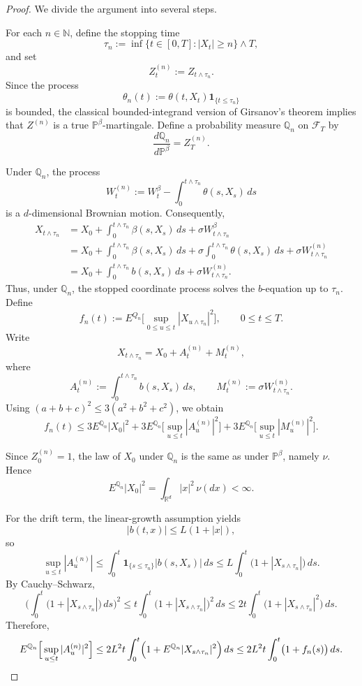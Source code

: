 \documentclass[twoside,11pt]{article}
\numberwithin{equation}{section}
\begin{document}
\begin{proof}
We divide the argument into several steps.

\medskip
For each $n\in\mathbb N$, define the stopping time
\[
\tau_n:=\inf\{t\in[0,T]: |X_t|\ge n\}\wedge T,
\]
and set
\[
Z_t^{(n)}:=Z_{t\wedge \tau_n}.
\]
Since the process
\[
\theta_n(t):=\theta(t,X_t)\mathbf 1_{\{t\le \tau_n\}}
\]
is bounded, the classical bounded-integrand version of Girsanov's theorem implies that $Z^{(n)}$ is a true $\mathbb{P}^\beta$-martingale. Define a probability measure $\mathbb{Q}_n$ on $\mathcal F_T$ by
\[
\frac{d\mathbb{Q}_n}{d\mathbb{P}^\beta}=Z_T^{(n)}.
\]

Under $\mathbb{Q}_n$, the process
\[
W_t^{(n)}:=W_t^\beta-\int_0^{t\wedge\tau_n}\theta(s,X_s)\,ds
\]
is a $d$-dimensional Brownian motion. Consequently,
\begin{align*}
X_{t\wedge\tau_n}
&=X_0+\int_0^{t\wedge\tau_n}\beta(s,X_s)\,ds+\sigma W_{t\wedge\tau_n}^\beta\\
&=X_0+\int_0^{t\wedge\tau_n}\beta(s,X_s)\,ds
+\sigma\int_0^{t\wedge\tau_n}\theta(s,X_s)\,ds
+\sigma W_{t\wedge\tau_n}^{(n)}\\
&=X_0+\int_0^{t\wedge\tau_n}b(s,X_s)\,ds+\sigma W_{t\wedge\tau_n}^{(n)}.
\end{align*}
Thus, under $\mathbb{Q}_n$, the stopped coordinate process solves the $b$-equation up to $\tau_n$. Define
\[
f_n(t):=E^{Q_n}\Big[\sup_{0\le u\le t}|X_{u\wedge\tau_n}|^2\Big],\qquad 0\le t\le T.
\]
Write
\[
X_{t\wedge\tau_n}=X_0+A_t^{(n)}+M_t^{(n)},
\]
where
\[
A_t^{(n)}:=\int_0^{t\wedge\tau_n}b(s,X_s)\,ds,
\qquad
M_t^{(n)}:=\sigma W_{t\wedge\tau_n}^{(n)}.
\]
Using $(a+b+c)^2\le 3(a^2+b^2+c^2)$, we obtain
\[
f_n(t)\le 3E^{\mathbb{Q}_n}|X_0|^2
+3E^{\mathbb{Q}_n}\Big[\sup_{u\le t}|A_u^{(n)}|^2\Big]
+3E^{\mathbb{Q}_n}\Big[\sup_{u\le t}|M_u^{(n)}|^2\Big].
\]

Since $Z_0^{(n)}=1$, the law of $X_0$ under $\mathbb{Q}_n$ is the same as under $\mathbb{P}^\beta$, namely $\nu$. Hence
\[
E^{\mathbb{Q}_n}|X_0|^2=\int_{\mathbb R^d}|x|^2\,\nu(dx)<\infty.
\]

For the drift term, the linear-growth assumption yields
\[
|b(t,x)|\le L(1+|x|),
\]
so
\[
\sup_{u\le t}|A_u^{(n)}|
\le \int_0^t \mathbf 1_{\{s\le \tau_n\}} |b(s,X_s)|\,ds
\le L\int_0^t \bigl(1+|X_{s\wedge\tau_n}|\bigr)\,ds.
\]
By Cauchy--Schwarz,
\[
\Big(\int_0^t \bigl(1+|X_{s\wedge\tau_n}|\bigr)\,ds\Big)^2
\le t\int_0^t \bigl(1+|X_{s\wedge\tau_n}|\bigr)^2\,ds
\le 2t\int_0^t \bigl(1+|X_{s\wedge\tau_n}|^2\bigr)\,ds.
\]
Therefore,
\[
E^{\mathbb{Q}_n}\Big[\sup_{u\le t}|A_u^{(n)}|^2\Big]
\le 2L^2 t\int_0^t \Bigl(1+E^{\mathbb{Q}_n}|X_{s\wedge\tau_n}|^2\Bigr)\,ds
\le 2L^2 t\int_0^t \bigl(1+f_n(s)\bigr)\,ds.
\]


\end{proof}
\end{document}
